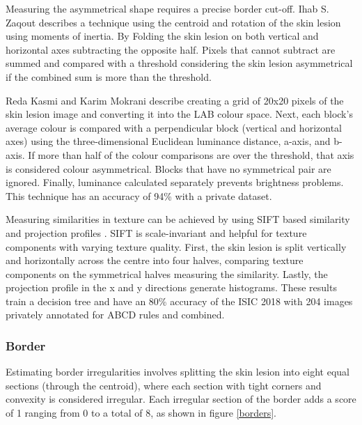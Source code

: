 \documentclass[10.5pt]{report}
\begin{document}
Measuring the asymmetrical shape requires a precise border cut-off. Ihab S. Zaqout \cite{Zaqout2016} describes a technique using the centroid and rotation of the skin lesion using moments of inertia. By Folding the skin lesion on both vertical and horizontal axes subtracting the opposite half. Pixels that cannot subtract are summed and compared with a threshold considering the skin lesion asymmetrical if the combined sum is more than the threshold.

Reda Kasmi and Karim Mokrani \cite{Kasmi2016a} describe creating a grid of 20x20 pixels of the skin lesion image and converting it into the LAB colour space. Next, each block's average colour is compared with a perpendicular block (vertical and horizontal axes) using the three-dimensional Euclidean luminance distance, a-axis, and b-axis. If more than half of the colour comparisons are over the threshold, that axis is considered colour asymmetrical. Blocks that have no symmetrical pair are ignored. Finally, luminance calculated separately prevents brightness problems. This technique has an accuracy of 94\% with a private dataset.

Measuring similarities in texture can be achieved by using SIFT based similarity and projection profiles \cite{Ali2020a}. SIFT is scale-invariant and helpful for texture components with varying texture quality. First, the skin lesion is split vertically and horizontally across the centre into four halves, comparing texture components on the symmetrical halves measuring the similarity. Lastly, the projection profile in the x and y directions generate histograms. These results train a decision tree and have an 80\% accuracy of the ISIC 2018 with 204 images privately annotated for ABCD rules and combined.

\subsubsection{Border}
Estimating border irregularities involves splitting the skin lesion into eight equal sections (through the centroid), where each section with tight corners and convexity is considered irregular. Each irregular section of the border adds a score of 1 ranging from 0 to a total of 8, as shown in figure \ref{borders}.
\end{document}
